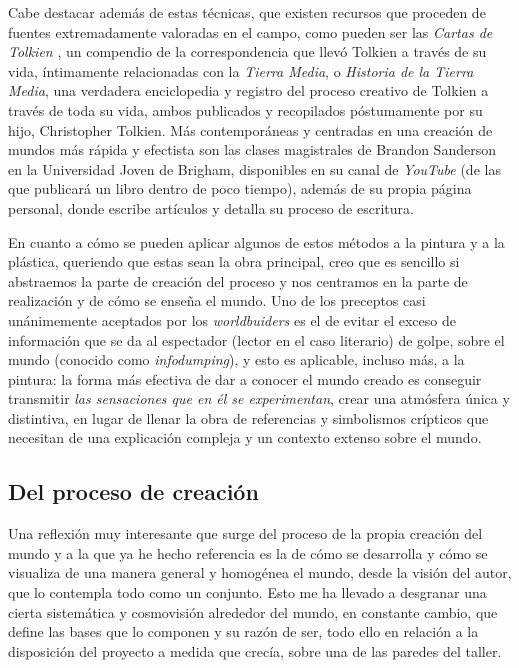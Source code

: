 \documentclass[twoside]{article}
\begin{document}
\begin{multicols}{2}
  Cabe destacar además de estas técnicas, que existen recursos que proceden de fuentes 
  extremadamente valoradas en el campo, como pueden ser las \emph{Cartas de Tolkien}
  \autocite*{cartast}, un compendio de la correspondencia que llevó Tolkien a través de su 
  vida, íntimamente relacionadas con la \emph{Tierra Media}, o \emph{Historia de la Tierra 
  Media}\autocite*{historiamedia}, una verdadera enciclopedia y registro del proceso 
  creativo de Tolkien a través de toda su vida, ambos publicados y recopilados póstumamente 
  por su hijo, Christopher Tolkien. Más contemporáneas y centradas en una creación de mundos 
  más rápida y efectista son las clases magistrales de Brandon Sanderson en la Universidad 
  Joven de Brigham, disponibles en su canal de \emph{YouTube} (de las que publicará un libro dentro de poco tiempo), además de 
  su propia página personal, donde escribe artículos y detalla su proceso de 
  escritura\autocite*{sanderson2020}.

  En cuanto a cómo se pueden aplicar algunos de estos métodos a la pintura
  y a la plástica, queriendo que estas sean la obra principal, creo que es
  sencillo si abstraemos la parte de creación del proceso y nos centramos
  en la parte de realización y de cómo se enseña el mundo. Uno de los
  preceptos casi unánimemente aceptados por los \emph{worldbuiders} es el
  de evitar el exceso de información que se da al espectador (lector en el
  caso literario) de golpe, sobre el mundo (conocido como
  \emph{infodumping}), y esto es aplicable, incluso más, a la pintura: la
  forma más efectiva de dar a conocer el mundo creado es conseguir
  transmitir \emph{las sensaciones que en él se experimentan}, crear una
  atmósfera única y distintiva, en lugar de llenar la obra de referencias
  y simbolismos crípticos que necesitan de una explicación compleja y un
  contexto extenso sobre el mundo.

  \hypertarget{del-proceso-de-creaciuxf3n}{%
    \subsection{Del proceso de
      creación}\label{del-proceso-de-creaciuxf3n}}

  Una reflexión muy interesante que surge del proceso de la propia
  creación del mundo y a la que ya he hecho referencia es la de cómo se
  desarrolla y cómo se visualiza de una manera general y homogénea el
  mundo, desde la visión del autor, que lo contempla todo como un
  conjunto. Esto me ha llevado a desgranar una cierta sistemática y
  cosmovisión alrededor del mundo, en constante cambio, que define las
  bases que lo componen y su razón de ser, todo ello en relación a la
  disposición del proyecto a medida que crecía, sobre una de las paredes
  del taller.


\end{multicols}
\end{document}
